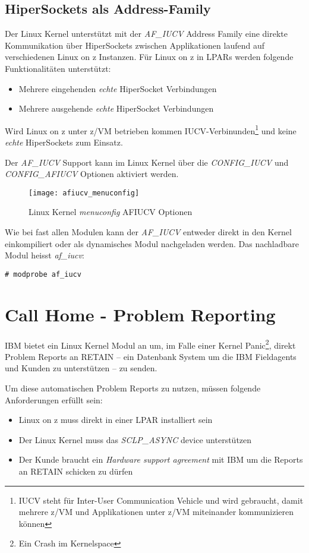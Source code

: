 \subsection{HiperSockets als Address-Family}

Der Linux Kernel unterstützt mit der \textit{AF\_IUCV} Address Family eine direkte Kommunikation über HiperSockets zwischen Applikationen laufend auf verschiedenen Linux on z Instanzen.
Für Linux on z in LPARs werden folgende Funktionalitäten unterstützt:
\begin{itemize}
    \item{Mehrere eingehenden \textit{echte} HiperSocket Verbindungen}
    \item{Mehrere ausgehende \textit{echte} HiperSocket Verbindungen}
\end{itemize}
Wird Linux on z unter z/VM betrieben kommen IUCV-Verbinunden\footnote{IUCV steht für Inter-User Communication Vehicle und wird gebraucht, damit mehrere z/VM und Applikationen unter z/VM miteinander kommunizieren können} und keine \textit{echte} HiperSockets zum Einsatz.

Der \textit{AF\_IUCV} Support kann im Linux Kernel über die \textit{CONFIG\_IUCV} und \textit{CONFIG\_AFIUCV} Optionen aktiviert werden.

\begin{figure}[h!]
\centering
\texttt{[image: afiucv\_menuconfig]}
\caption{Linux Kernel \textit{menuconfig} AF\textunderscore IUCV Optionen}
\label{fig:AFIUCVMENUCONFIG}
\end{figure}

Wie bei fast allen Modulen kann der \textit{AF\_IUCV} entweder direkt in den Kernel einkompiliert oder als dynamisches Modul nachgeladen werden.
Das nachladbare Modul heisst \textit{af\_iucv}:\cite{IBMAFIUCV}

\begin{lstlisting}
# modprobe af_iucv
\end{lstlisting}

\section{Call Home - Problem Reporting}

IBM bietet ein Linux Kernel Modul an um, im Falle einer Kernel Panic\footnote{Ein Crash im Kernelspace}, direkt Problem Reports an RETAIN -- ein Datenbank System um die IBM Fieldagents und Kunden zu unterstützen -- zu senden.

Um diese automatischen Problem Reports zu nutzen, müssen folgende Anforderungen erfüllt sein:\cite{IBMCallHome}
\begin{itemize}
    \item{Linux on z muss direkt in einer LPAR installiert sein}
    \item{Der Linux Kernel muss das \textit{SCLP\_ASYNC} device unterstützen}
    \item{Der Kunde braucht ein \textit{Hardware support agreement} mit IBM um die Reports an RETAIN schicken zu dürfen}
\end{itemize}

